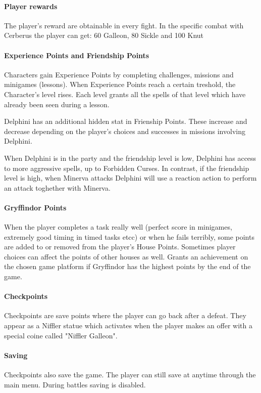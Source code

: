 \pagebreak

\paragraph{Player rewards}

The player's reward are obtainable in every fight. In the specific combat with Cerberus the player can get: 60 Galleon, 80 Sickle and 100 Knut


\paragraph{Experience Points and Friendship Points}

Characters gain Experience Points by completing challenges, missions and minigames (lessons). When Experience Points reach a certain treshold, the Character's level rises. 
Each level grants all the spells of that level which have already been seen during a lesson.

Delphini has an additional hidden stat in Frienship Points. These increase and decrease depending on the player's choices and successes in missions involving Delphini.

When Delphini is in the party and the friendship level is low, Delphini has access to more aggressive spells, up to Forbidden Curses. 
In contrast, if the friendship level is high, when Minerva attacks Delphini will use a reaction action to perform an attack toghether with Minerva.


\paragraph{Gryffindor Points}

When the player completes a task really well (perfect score in minigames, extremely good timing in timed tasks etcc) or when he fails terribly, some points are added to or removed from the player's House Points. Sometimes player choices can affect the points of other houses as well.
Grants an achievement on the chosen game platform if Gryffindor has the highest points by the end of the game.

\paragraph{Checkpoints}

Checkpoints are save points where the player can go back after a defeat. They appear as a Niffler statue which activates when the player makes an offer with a special coine called "Niffler Galleon".

\paragraph{Saving}

Checkpoints also save the game. The player can still save at anytime through the main menu. During battles saving is disabled.
\pagebreak